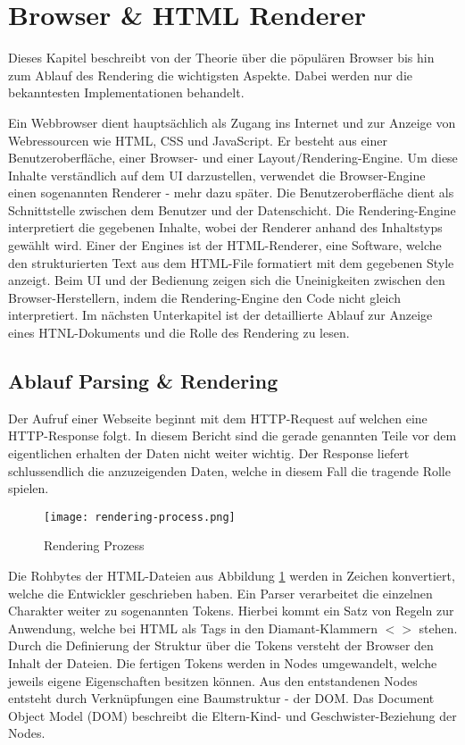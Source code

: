 \section{Browser \& HTML Renderer}

Dieses Kapitel beschreibt von der Theorie über die pöpulären Browser bis hin zum Ablauf des Rendering die wichtigsten Aspekte.
Dabei werden nur die bekanntesten Implementationen behandelt.

Ein Webbrowser dient hauptsächlich als Zugang ins Internet und zur Anzeige von Webressourcen wie HTML, CSS und JavaScript.
Er besteht aus einer Benutzeroberfläche, einer Browser- und einer Layout/Rendering-Engine.
Um diese Inhalte verständlich auf dem UI darzustellen, verwendet die Browser-Engine einen sogenannten Renderer - mehr dazu später.
Die Benutzeroberfläche dient als Schnittstelle zwischen dem Benutzer und der Datenschicht. 
Die Rendering-Engine interpretiert die gegebenen Inhalte, wobei der Renderer anhand des Inhaltstyps gewählt wird. 
Einer der Engines ist der HTML-Renderer, eine Software, welche den strukturierten Text aus dem HTML-File formatiert mit dem gegebenen Style anzeigt.
Beim UI und der Bedienung zeigen sich die Uneinigkeiten zwischen den Browser-Herstellern, indem die Rendering-Engine den Code nicht gleich interpretiert.
Im nächsten Unterkapitel ist der detaillierte Ablauf zur Anzeige eines HTNL-Dokuments und die Rolle des Rendering zu lesen.


\subsection{Ablauf Parsing \& Rendering}

Der Aufruf einer Webseite beginnt mit dem HTTP-Request auf welchen eine HTTP-Response folgt.
In diesem Bericht sind die gerade genannten Teile vor dem eigentlichen erhalten der Daten nicht weiter wichtig.
Der Response liefert schlussendlich die anzuzeigenden Daten, welche in diesem Fall die tragende Rolle spielen.

\begin{figure}[!htb]
    \centering
    \texttt{[image: rendering-process.png]}
    \caption{Rendering Prozess}
    \label{Abbildung:RenderingProcess}
\end{figure}

Die Rohbytes der HTML-Dateien aus Abbildung \ref{Abbildung:RenderingProcess} werden in Zeichen konvertiert, welche die Entwickler geschrieben haben.
Ein Parser verarbeitet die einzelnen Charakter weiter zu sogenannten Tokens.
Hierbei kommt ein Satz von Regeln zur Anwendung, welche bei HTML als Tags in den Diamant-Klammern $<>$ stehen.
Durch die Definierung der Struktur über die Tokens versteht der Browser den Inhalt der Dateien.
Die fertigen Tokens werden in Nodes umgewandelt, welche jeweils eigene Eigenschaften besitzen können.
Aus den entstandenen Nodes entsteht durch Verknüpfungen eine Baumstruktur - der DOM.
Das Document Object Model (DOM) beschreibt die Eltern-Kind- und Geschwister-Beziehung der Nodes.

